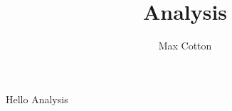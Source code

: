 \documentclass[10pt,a4paper]{article}
\title{Analysis}
\author{Max Cotton}
\date{}
\begin{document}
\maketitle

\section{}

Hello Analysis
\end{document}
